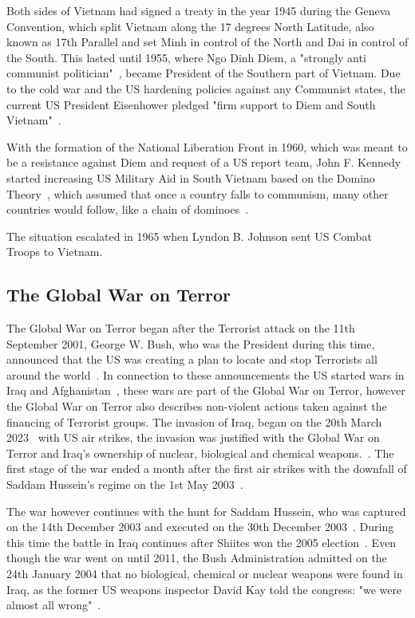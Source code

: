 \documentclass[12pt,a4paper]{article}
\begin{document}
		Both sides of Vietnam had signed a treaty in the year 1945 during the Geneva Convention, which split Vietnam along the 17 degrees North Latitude, also known as 17th Parallel and set Minh in control of the North and Dai in control of the South. This lasted until 1955, where Ngo Dinh Diem, a "strongly anti communist politician"~\cite{vietnam-war-history}, became President of the Southern part of Vietnam. Due to the cold war and the US hardening policies against any Communist states, the current US President Eisenhower pledged "firm support to Diem and South Vietnam"~\cite{vietnam-war-history}.
		
		With the formation of the National Liberation Front in 1960, which was meant to be a resistance against Diem and request of a US report team, John F. Kennedy started increasing US Military Aid in South Vietnam based on the Domino Theory~\cite{vietnam-war-history}, which assumed that once a country falls to communism, many other countries would follow, like a chain of dominoes~\cite{cold-war-domino-theory}.
		
		The situation escalated in 1965 when Lyndon B. Johnson sent US Combat Troops to Vietnam.
		\subsection{The Global War on Terror}
		The Global War on Terror began after the Terrorist attack on the 11th September 2001, George W. Bush, who was the President during this time, announced that the US was creating a plan to locate and stop Terrorists all around the world~\cite{gowt-bushlibrary}. In connection to these announcements the US started wars in Iraq and Afghanistan~\cite{gowt-bushlibrary}, these wars are part of the Global War on Terror, however the Global War on Terror also describes non-violent actions taken against the financing of Terrorist groups.
		The invasion of Iraq, began on the 20th March 2023~\cite{cfr-iraq-war} with US air strikes, the invasion was justified with the Global War on Terror and Iraq's ownership of nuclear, biological and chemical weapons.~\cite{britannica-iraq-war}. The first stage of the war ended a month after the first air strikes with the downfall of Saddam Hussein's regime on the 1st May 2003~\cite{cfr-iraq-war}. 
		
		The war however continues with the hunt for Saddam Hussein, who was captured on the 14th December 2003 and executed on the 30th December 2003~\cite{cfr-iraq-war}. During this time the battle in Iraq continues after Shiites won the 2005 election~\cite{cfr-iraq-war}.
		Even though the war went on until 2011, the Bush Administration admitted on the 24th January 2004 that no biological, chemical or nuclear weapons were found in Iraq, as the former US weapons inspector David Kay told the congress: "we were almost all wrong"~\cite{cnn-david-kay-senate-hearing}.
		
\end{document}
